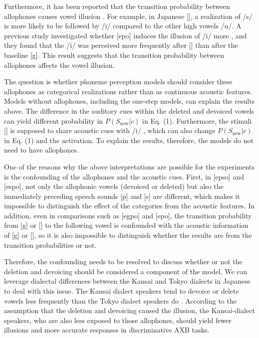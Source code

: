 \documentclass[a4paper,11pt,twocolumn]{article}
\begin{document}
Furthermore, it has been reported that the transition probability between allophones causes vowel illusion \cite{kilpatrick2020japanese}. For example, in Japanese [\textctc], a realization of /s/ is more likely to be followed by /i/ compared to the other high vowels /u/. A previous study investigated whether [e\textctc{}po] induces the illusion of /i/ more \cite{kilpatrick2020japanese}, and they found that the /i/ was perceived more frequently after [\textctc] than after the baseline [g]. This result suggests that the transition probability between allophones affects the vowel illusion.

The question is whether phoneme perception models should consider these allophones as categorical realizations rather than as continuous acoustic features. Models without allophones, including the one-step models, can explain the results above. The difference in the auditory cues within the deleted and devoiced vowels can yield different probability in $P(S_{\text{new}}|c)$ in Eq. (1). Furthermore, the stimuli [\textctc] is supposed to share acoustic cues with /i/ \cite{kubozono1999japanese_eng}, which can also change $P(S_{\text{new}}|c)$ in Eq. (1) and the activation. To explain the results, therefore, the models do not need to have allophones.

One of the reasons why the above interpretations are possible for the experiments is the confounding of the allophones and the acoustic cues. First, in [ep\textsubring{\textturnm}so] and [espo], not only the allophonic vowels (devoiced or deleted) but also the immediately preceding speech sounds [p] and [s] are different, which makes it impossible to distinguish the effect of the categories from the acoustic features. In addition, even in comparisons such as [egpo] and [e\textctc{}po], the transition probability from [g] or [\textctc] to the following vowel is confounded with the acoustic information of [g] or [\textctc], so it is also impossible to distinguish whether the results are from the transition probabilities or not.

Therefore, the confounding needs to be resolved to discuss whether or not the deletion and devoicing should be considered a component of the model. We can leverage dialectal differences between the Kansai and Tokyo dialects in Japanese \cite{kishiyama2022onestep} to deal with this issue. The Kansai dialect speakers tend to devoice or delete vowels less frequently than the Tokyo dialect speakers do \cite{byun2011_eng, byun2012_eng}. According to the assumption that the deletion and devoicing caused the illusion, the Kansai-dialect speakers, who are also less exposed to those allophones, should yield fewer illusions and more accurate responses in discriminative AXB tasks.
\end{document}

